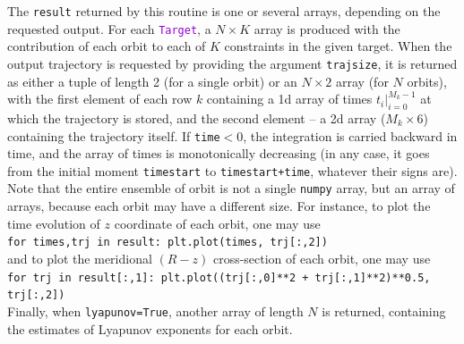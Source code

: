 \documentclass[12pt]{article}
\newcommand{\ttt}[1]{\textcolor{darkviolet}{\texttt{#1}}}
\newcommand{\ppp}[1]{\textcolor{darkolive} {\texttt{#1}}}
\begin{document}
The \texttt{result} returned by this routine is one or several arrays, depending on the requested output. For each \ttt{Target}, a $N\times K$ array is produced with the contribution of each orbit to each of $K$ constraints in the given target. When the output trajectory is requested by providing the argument \ppp{trajsize}, it is returned as either a tuple of length 2 (for a single orbit) or an $N\times 2$ array (for $N$ orbits), with the first element of each row $k$ containing a 1d array of times $t_i |_{i=0}^{M_k-1}$ at which the trajectory is stored, and the second element -- a 2d array ($M_k\times6$) containing the trajectory itself. If \texttt{time}$<0$, the integration is carried backward in time, and the array of times is monotonically decreasing (in any case, it goes from the initial moment \texttt{timestart} to \texttt{timestart+time}, whatever their signs are).
Note that the entire ensemble of orbit is not a single \texttt{numpy} array, but an array of arrays, because each orbit may have a different size.
For instance, to plot the time evolution of $z$ coordinate of each orbit, one may use\\[1mm]
\texttt{for times,trj in result: plt.plot(times, trj[:,2])}\\[1mm]
and to plot the meridional $(R-z)$ cross-section of each orbit, one may use\\[1mm]
\texttt{for trj in result[:,1]: plt.plot((trj[:,0]**2 + trj[:,1]**2)**0.5, trj[:,2])}\\[1mm]
Finally, when \texttt{lyapunov=True}, another array of length $N$ is returned, containing the estimates of Lyapunov exponents for each orbit.
\end{document}
